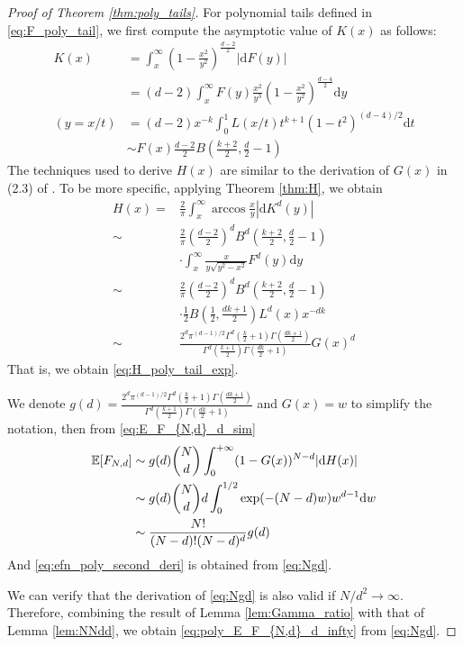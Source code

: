 \documentclass[conference,a4paper]{IEEEtran}
\def\E{\mathbb{E}}
\def\dd{\mathrm{d}}
\begin{document}
\begin{proof}[Proof of Theorem \ref{thm:poly_tails}]
For polynomial tails defined in \eqref{eq:F_poly_tail},
we first compute the asymptotic value of $K(x)$
as follows:
\begin{align*}
     K(x) & = \int_x^{\infty} (1-\frac{x^2}{y^2})^{\frac{d-2}{2}} |\dd F(y)| \\
     &= (d-2)\int_x^{\infty} F(y)\frac{x^2}{y^3} (1-\frac{x^2}{y^2})^{\frac{d-4}{2}} \dd y\\
     (y=x/t) &= (d-2)x^{-k} \int_0^{1} L(x/t) t^{k+1} (1-t^2)^{(d-4)/2}\dd t \\
     & \sim F(x) \frac{d-2}{2} B\left(\frac{k+2}{2}, \frac{d}{2}-1\right) 
\end{align*}
The techniques used to derive $H(x)$ are similar to the derivation of $G(x)$
in (2.3) of \cite{carnal1970konvexe}.
To be more specific, applying Theorem \ref{thm:H}, we obtain
\begin{align*}
     H(x) =& \frac{2}{\pi}
     \int_x^{\infty} \arccos\frac{x}{y}
     |\dd K^d(y)| \\
     \sim& \frac{2}{\pi}\left(\frac{d-2}{2}\right)^d
     B^d\left(\frac{k+2}{2}, \frac{d}{2}-1\right)\\
     &\cdot\int_x^{\infty} \frac{x}{y \sqrt{y^2-x^2}} F^d(y) \dd y \\
     \sim& \frac{2}{\pi}\left(\frac{d-2}{2}\right)^d
     B^d\left(\frac{k+2}{2}, \frac{d}{2}-1\right) \\
     &\cdot\frac{1}{2}
     B\left(\frac{1}{2}, \frac{dk+1}{2}\right)L^d(x) x^{-dk} \\
     \sim& \frac{2^d \pi^{(d-1)/2}\Gamma^d(\frac{k}{2}+1)
     \Gamma(\frac{dk+1}{2})}{
         \Gamma^d(\frac{k+1}{2}) \Gamma(\frac{dk}{2}+1)} G(x)^d 
\end{align*}
That is, we obtain \eqref{eq:H_poly_tail_exp}.

We denote $g(d)=\frac{2^d \pi^{(d-1)/2}\Gamma^d(\frac{k}{2}+1)
\Gamma(\frac{dk+1}{2})}{
    \Gamma^d(\frac{k+1}{2}) \Gamma(\frac{dk}{2}+1)}$
and $G(x)=w$ to simplify the notation, then from \eqref{eq:E_F_{N,d}_d_sim}
\begin{align}
     \E[F_{N,d}] &\sim g(d)\binom{N}{d} \int_0^{+\infty} 
      (1-G(x))^{N-d} |\dd H(x)| \notag \\
      &\sim g(d)\binom{N}{d}d\int_0^{1/2} \exp(-(N-d)w)w^{d-1}\dd w
      \notag \\
      &\sim \frac{N!}{(N-d)! (N-d)^d}g(d) \label{eq:Ngd}
\end{align}
And \eqref{eq:efn_poly_second_deri} is obtained from \eqref{eq:Ngd}.

We can verify that the derivation of \eqref{eq:Ngd} is also valid if $N/d^2\to \infty$.
Therefore, combining the result of Lemma \ref{lem:Gamma_ratio}
with that of Lemma \ref{lem:NNdd},
we obtain \eqref{eq:poly_E_F_{N,d}_d_infty}
from \eqref{eq:Ngd}.
\end{proof}
\end{document}
